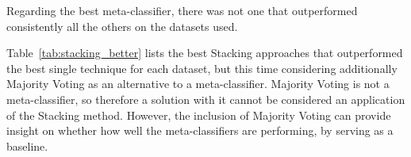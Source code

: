 Regarding the best meta-classifier, there was not one that outperformed consistently all the others on the datasets used.

\begin{table}[!ht]
	\centering
	\caption{Measurements of the metric F1 for the Stacking approaches that outperform the best algorithm for each dataset.}
	\label{tab:stacking_better_no_maj}
\end{table}

Table~\ref{tab:stacking_better} lists the best Stacking approaches that outperformed the best single technique for each dataset, but this time considering additionally Majority Voting as an alternative to a meta-classifier.
Majority Voting is not a meta-classifier, so therefore a solution with it cannot be considered an application of the Stacking method.
However, the inclusion of Majority Voting can provide insight on whether how well the meta-classifiers are performing, by serving as a baseline.

